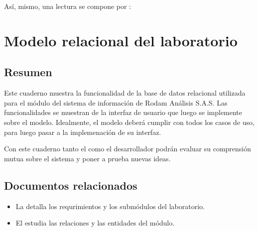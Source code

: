 \documentclass[letterpaper,10pt,spanish]{sphinxmanual}
\begin{document}

Así, mismo, una lectura se compone por :



\chapter{Modelo relacional del laboratorio}
\label{\detokenize{requerimientos/laboratorio_aceptacion:modelo-relacional-del-laboratorio}}\label{\detokenize{requerimientos/laboratorio_aceptacion::doc}}

\section{Resumen}
\label{\detokenize{requerimientos/laboratorio_aceptacion:resumen}}
Este cuaderno muestra la funcionalidad de la base de datos relacional
utilizada para el módulo  del sistema de información de
Rodam Análisis S.A.S. Las funcionalidades se muestran
 de la interfaz de usuario que luego se implemente
sobre el modelo. Idealmente, el modelo deberá cumplir con todos los
casos de uso, para luego pasar a la implemenación de su interfaz.

Con este cuaderno tanto el  como el desarrollador podrán
evaluar su comprensión mutua sobre el sistema y poner a prueba nuevas
ideas.


\section{Documentos relacionados}
\label{\detokenize{requerimientos/laboratorio_aceptacion:documentos-relacionados}}\begin{itemize}
\item {} 
La  detalla los requrimientos y los
submódulos del laboratorio.

\item {} 
El  estudia las relaciones y las entidades del
módulo.

\end{itemize}
\end{document}
